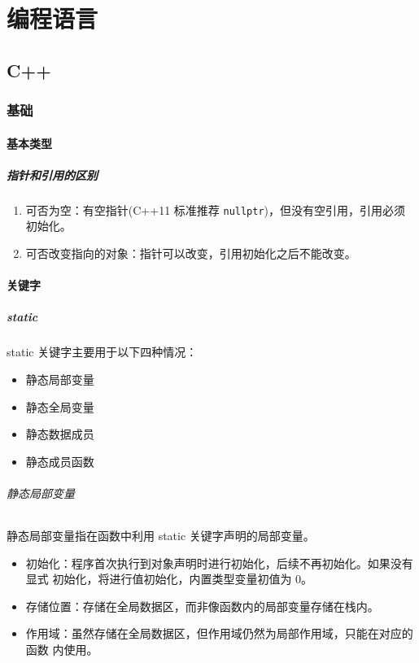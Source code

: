 \part{编程语言}
\chapter{C++}

\section{基础}
\subsection{基本类型}
\subsubsection{指针和引用的区别}
\begin{enumerate}
  \item 可否为空：有空指针(C++11 标准推荐 \texttt{nullptr})，但没有空引用，引用必须初始化。
  \item 可否改变指向的对象：指针可以改变，引用初始化之后不能改变。
\end{enumerate}

\subsection{关键字}
\subsubsection{static}
static 关键字主要用于以下四种情况：

\begin{itemize}
  \item 静态局部变量
  \item 静态全局变量
  \item 静态数据成员
  \item 静态成员函数
\end{itemize}

\paragraph{静态局部变量}
静态局部变量指在函数中利用 static 关键字声明的局部变量。

\begin{itemize}
  \item 初始化：程序首次执行到对象声明时进行初始化，后续不再初始化。如果没有显式
    初始化，将进行值初始化，内置类型变量初值为 0。
  \item 存储位置：存储在全局数据区，而非像函数内的局部变量存储在栈内。
  \item 作用域：虽然存储在全局数据区，但作用域仍然为局部作用域，只能在对应的函数
    内使用。
\end{itemize}

